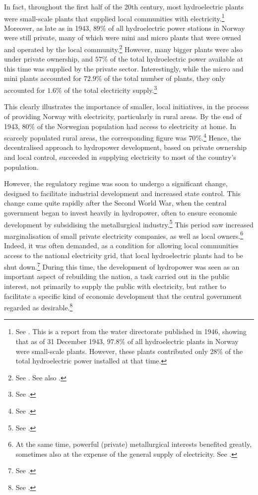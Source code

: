 In fact, throughout the first half of the 20th century, most hydroelectric plants were small-scale plants that supplied local communities with electricity.\footnote{See \cite[11]{utbygd46}. This is a report from the water directorate published in 1946, showing that as of 31 December 1943, $97.8 \%$ of all hydroelectric plants in Norway were small-scale plants. However, these plants contributed only $28 \%$ of the total hydroelectric power installed at that time.} Moreover, as late as in 1943, $89 \%$ of all hydroelectric power stations in Norway were still private, many of which were mini and micro plants that were owned and operated by the local community.\footnote{See \cite[6]{utbygd46}. See also \cite[111]{hindrum94}.} However, many bigger plants were also under private ownership, and $57 \%$ of the total hydroelectric power available at this time was supplied by the private sector. Interestingly,  while the micro and mini plants accounted for $72.9 \%$ of the total number of plants, they only accounted for $1.6 \%$ of the total electricity supply.\footnote{See \cite[7]{utbygd46}.} 

This clearly illustrates the importance of smaller, local initiatives, in the process of providing Norway with electricity, particularly in rural areas. By the end of 1943, $80 \%$ of the Norwegian population had access to electricity at home. In scarcely populated rural areas, the corresponding figure was $70 \%$.\footnote{See \cite[7]{utbygd46}.} Hence, the decentralised approach to hydropower development, based on private ownership and local control, succeeded in supplying electricity to most of the country's population.

However, the regulatory regime was soon to undergo a significant change, designed to facilitate industrial development and increased state control. This change came quite rapidly after the Second World War, when the central government began to invest heavily in hydropower, often to ensure economic development by subsidising the metallurgical industry.\footnote{See \cite[59-65]{thue96}.} This period saw increased marginalisation of small private electricity companies, as well as local owners.\footnote{At the same time, powerful (private) metallurgical interests benefited greatly, sometimes also at the expense of the general supply of electricity. See \cite[65-71]{tvedt96}.} Indeed, it was often demanded, as a condition for allowing local communities access to the national electricity grid, that local hydroelectric  plants had to be shut down.\footnote{See \cite[p.111]{hindrum94}.} During this time, the development of hydropower was seen as an important aspect of rebuilding the nation, a task carried out in the public interest, not primarily to supply the public with electricity, but rather to facilitate a specific kind of economic development that the central government regarded as desirable.\footnote{See \cite[59]{thue96}.}

